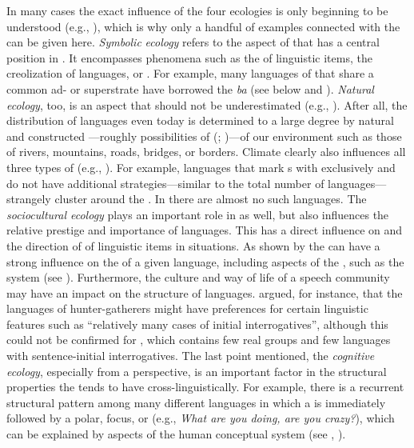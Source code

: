 In many cases the exact influence of the four ecologies is only beginning to be understood (e.g., \citealt{DeBusser2015}), which is why only a handful of examples connected with the  can be given here. \textit{Symbolic} \textit{ecology} refers to the aspect of  that has a central position in . It encompasses phenomena such as the  of linguistic items, the creolization of languages, or . For example, many languages of  that share a common  ad- or superstrate have borrowed the  \textit{ba}  (see below and ). \textit{Natural ecology}, too, is an aspect that should not be underestimated (e.g., \citealt{AxelsenManrubia2014}). After all, the distribution of languages even today is determined to a large degree by natural and constructed \textit{}---roughly possibilities of  (\citealt{Lewin1936}; \citealt{Gibson1979})---of our environment such as those of rivers, mountains, roads, bridges, or borders. Climate clearly also influences all three types of  (e.g., \citealt{Everett2015,Everett2016}). For example, languages that mark s with  exclusively and do not have additional  strategies---similar to the total number of languages---strangely cluster around the  \citep{Dryer2013m}. In  there are almost no such languages. The \textit{sociocultural ecology} plays an important role in  as well, but also influences the relative prestige and importance of languages. This has a direct influence on  and the direction of  of linguistic items in  situations. As shown by \citet{Trudgill2011} the \textit{} can have a strong influence on the  of a given language, including aspects of the , such as the  system (see ). Furthermore, the culture and way of life of a speech community may have an impact on the structure of languages. \citet[388]{CysouwComrie2013} argued, for instance, that the languages of hunter-gatherers might have preferences for certain linguistic features such as “relatively many cases of initial interrogatives”, although this could not be confirmed for , which contains few real  groups and few languages with sentence-initial interrogatives. The last point mentioned, the \textit{cognitive ecology}, especially from a  perspective, is an important factor in the structural properties the  tends to have cross-linguistically. For example, there is a recurrent structural pattern among many different languages in which a  is immediately followed by a polar, focus, or  (e.g., \textit{What are you doing, are you crazy?}), which can be explained by aspects of the human conceptual system (see , ).

